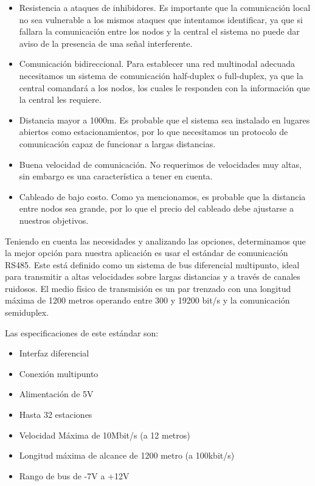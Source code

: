 \begin{itemize}
    \item Resistencia a ataques de inhibidores. Es importante que la comunicación local no sea vulnerable a los mismos ataques que intentamos identificar, ya que
    si fallara la comunicación entre los nodos y la central el sistema no puede dar aviso de la presencia de una señal interferente.
    \item Comunicación bidireccional. Para establecer una red multinodal adecuada necesitamos un sistema de comunicación half-duplex o full-duplex, ya que 
    la central comandará a los nodos, los cuales le responden con la información que la central les requiere.
    \item Distancia mayor a 1000m. Es probable que el sistema sea instalado en lugares abiertos como estacionamientos, por lo que necesitamos un protocolo de 
    comunicación capaz de funcionar a largas distancias.
    \item Buena velocidad de comunicación. No requerimos de velocidades muy altas, sin embargo es una característica a tener en cuenta.
    \item Cableado de bajo costo. Como ya mencionamos, es probable que la distancia entre nodos sea grande, por lo que el precio del cableado debe ajustarse 
    a nuestros objetivos.

\end{itemize}

Teniendo en cuenta las necesidades y analizando las opciones, determinamos que la mejor opción para nuestra aplicación es usar el estándar de comunicación RS485. 
Este está definido como un sistema de bus diferencial multipunto, ideal para transmitir a altas velocidades sobre largas distancias y a través de canales ruidosos.
El medio físico de transmisión es un par trenzado con una longitud máxima de 1200 metros operando entre 300 y 19200 bit/s y la comunicación semiduplex.\par
Las especificaciones de este estándar son:

\begin{itemize}
    \item Interfaz diferencial
    \item Conexión multipunto
    \item Alimentación de 5V
    \item Hasta 32 estaciones 
    \item Velocidad Máxima de 10Mbit/s (a 12 metros)
    \item Longitud máxima de alcance de 1200 metro (a 100kbit/s)
    \item Rango de bus de -7V a +12V

\end{itemize}

